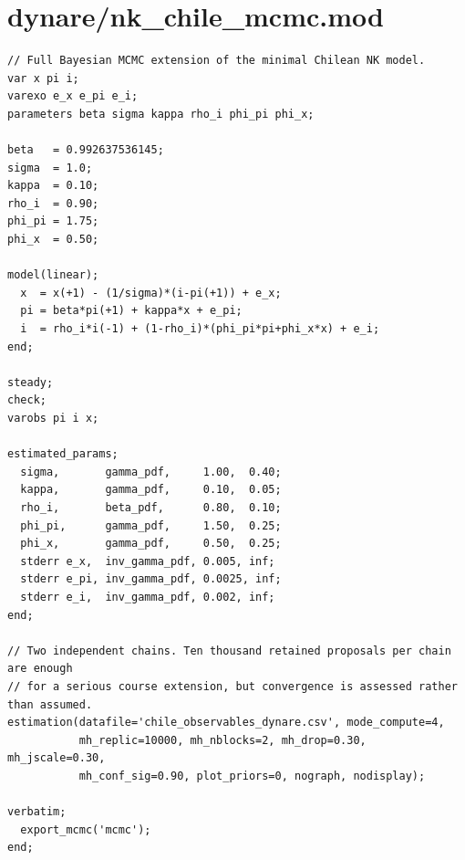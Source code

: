 \documentclass[9pt]{extarticle}
\begin{document}
\section{dynare/nk\_chile\_mcmc.mod}
\begin{lstlisting}[language={}]
// Full Bayesian MCMC extension of the minimal Chilean NK model.
var x pi i;
varexo e_x e_pi e_i;
parameters beta sigma kappa rho_i phi_pi phi_x;

beta   = 0.992637536145;
sigma  = 1.0;
kappa  = 0.10;
rho_i  = 0.90;
phi_pi = 1.75;
phi_x  = 0.50;

model(linear);
  x  = x(+1) - (1/sigma)*(i-pi(+1)) + e_x;
  pi = beta*pi(+1) + kappa*x + e_pi;
  i  = rho_i*i(-1) + (1-rho_i)*(phi_pi*pi+phi_x*x) + e_i;
end;

steady;
check;
varobs pi i x;

estimated_params;
  sigma,       gamma_pdf,     1.00,  0.40;
  kappa,       gamma_pdf,     0.10,  0.05;
  rho_i,       beta_pdf,      0.80,  0.10;
  phi_pi,      gamma_pdf,     1.50,  0.25;
  phi_x,       gamma_pdf,     0.50,  0.25;
  stderr e_x,  inv_gamma_pdf, 0.005, inf;
  stderr e_pi, inv_gamma_pdf, 0.0025, inf;
  stderr e_i,  inv_gamma_pdf, 0.002, inf;
end;

// Two independent chains. Ten thousand retained proposals per chain are enough
// for a serious course extension, but convergence is assessed rather than assumed.
estimation(datafile='chile_observables_dynare.csv', mode_compute=4,
           mh_replic=10000, mh_nblocks=2, mh_drop=0.30, mh_jscale=0.30,
           mh_conf_sig=0.90, plot_priors=0, nograph, nodisplay);

verbatim;
  export_mcmc('mcmc');
end;
\end{lstlisting}
\clearpage
\end{document}
